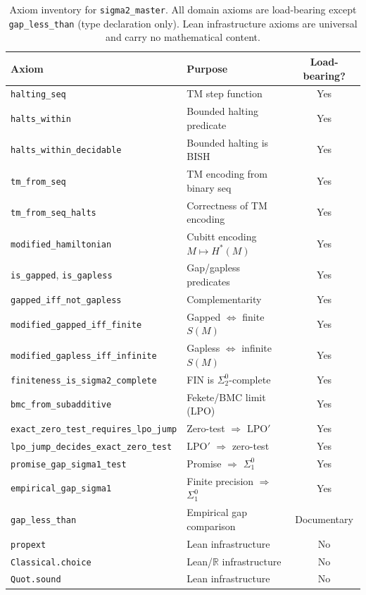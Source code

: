 \documentclass[11pt,a4paper]{article}
\theoremstyle{plain}
\theoremstyle{definition}
\newcommand{\RR}{\mathbb{R}}
\newcommand{\LPOj}{\ensuremath{\mathrm{LPO'}}}
\begin{document}
\begin{table}[ht]
\centering\small
\begin{tabular}{@{}lp{6cm}c@{}}
\toprule
\textbf{Axiom} & \textbf{Purpose} & \textbf{Load-bearing?} \\
\midrule
\texttt{halting\_seq} & TM step function & Yes \\
\texttt{halts\_within} & Bounded halting predicate & Yes \\
\texttt{halts\_within\_decidable} & Bounded halting is BISH & Yes \\
\texttt{tm\_from\_seq} & TM encoding from binary seq & Yes \\
\texttt{tm\_from\_seq\_halts} & Correctness of TM encoding & Yes \\
\texttt{modified\_hamiltonian} & Cubitt encoding $M \mapsto H^*(M)$ & Yes \\
\texttt{is\_gapped}, \texttt{is\_gapless} & Gap/gapless predicates & Yes \\
\texttt{gapped\_iff\_not\_gapless} & Complementarity & Yes \\
\texttt{modified\_gapped\_iff\_finite} & Gapped $\Leftrightarrow$ finite $S(M)$ & Yes \\
\texttt{modified\_gapless\_iff\_infinite} & Gapless $\Leftrightarrow$ infinite $S(M)$ & Yes \\
\texttt{finiteness\_is\_sigma2\_complete} & FIN is $\Sigma_2^0$-complete & Yes \\
\texttt{bmc\_from\_subadditive} & Fekete/BMC limit (LPO) & Yes \\
\texttt{exact\_zero\_test\_requires\_lpo\_jump} & Zero-test $\Rightarrow$ $\LPOj$ & Yes \\
\texttt{lpo\_jump\_decides\_exact\_zero\_test} & $\LPOj$ $\Rightarrow$ zero-test & Yes \\
\texttt{promise\_gap\_sigma1\_test} & Promise $\Rightarrow$ $\Sigma_1^0$ & Yes \\
\texttt{empirical\_gap\_sigma1} & Finite precision $\Rightarrow$ $\Sigma_1^0$ & Yes \\
\texttt{gap\_less\_than} & Empirical gap comparison & Documentary \\
\midrule
\texttt{propext} & Lean infrastructure & No \\
\texttt{Classical.choice} & Lean/$\RR$ infrastructure & No \\
\texttt{Quot.sound} & Lean infrastructure & No \\
\bottomrule
\end{tabular}
\caption{Axiom inventory for \texttt{sigma2\_master}.
All domain axioms are load-bearing except \texttt{gap\_less\_than}
(type declaration only).  Lean infrastructure axioms are universal
and carry no mathematical content.}
\label{tab:axioms}
\end{table}
\end{document}
